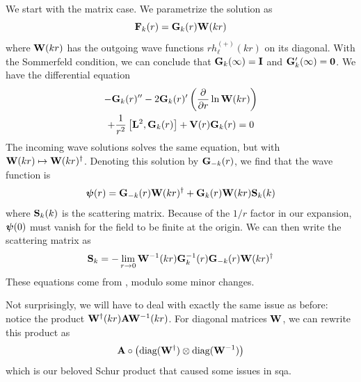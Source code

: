 We start with the matrix case. We parametrize the solution as
  \begin{equation}
    \mathbf{F}_k(r) = \mathbf{G}_k(r)\mathbf{W}(kr)
  \end{equation}
where $\mathbf{W}(kr)$ has the outgoing wave functions $rh_\ell^{(+)}(kr)$ on its diagonal. 
With the Sommerfeld condition, we can conclude that $\mathbf{G}_k(\infty) = \mathbf{I}$ and 
$\mathbf{G}_k'(\infty)=\mathbf{0}$. We have the differential equation
  \begin{multline}
   -\mathbf{G}_k(r)''-2\mathbf{G}_k(r)'\left(\frac{\partial}{\partial r}\ln\mathbf{W}(kr)\right)
    \\+\frac{1}{r^2}\left[\mathbf{L}^2,\mathbf{G}_k(r)\right]+\mathbf{V}(r)\mathbf{G}_k(r)=0
  \end{multline}
The incoming wave solutions solves the same equation, but with
$\mathbf{W}(kr)\mapsto \mathbf{W}(kr)^\dagger$. Denoting this solution 
by $\mathbf{G}_{-k}(r)$, we find that the wave function is
  \begin{equation}
    \boldsymbol{\psi}(r) = \mathbf{G}_{-k}(r)\mathbf{W}(kr)^\dagger+\mathbf{G}_k(r)\mathbf{W}(kr)\mathbf{S}_k(k)
  \end{equation}
where $\mathbf{S}_k(k)$ is the scattering matrix. Because of the
$1/r$ factor in our expansion, $\boldsymbol{\psi}(0)$ must vanish 
for the field to be finite at the origin. We can then write the 
scattering matrix as
  \begin{equation}
   \mathbf{S}_k = -\lim_{r\rightarrow0}\mathbf{W}^{-1}(kr)\mathbf{G}^{-1}_k(r)\mathbf{G}_{-k}(r)\mathbf{W}(kr)^\dagger
  \end{equation}
These equations come from \cite{FOR2012}, modulo some minor changes.

Not surprisingly, we will have to deal with exactly the same issue as before: 
notice the product $\mathbf{W}^\dagger(kr)\mathbf{A}\mathbf{W}^{-1}(kr)$. For diagonal
matrices $\mathbf{W}$, we can rewrite this product as
  \begin{equation*}
    \mathbf{A}\circ\left(\text{diag}(\mathbf{W}^\dagger)\otimes\text{diag}(\mathbf{W}^{-1})\right)
  \end{equation*}
which is our beloved Schur product that caused some issues in \gls{sqa}. 

